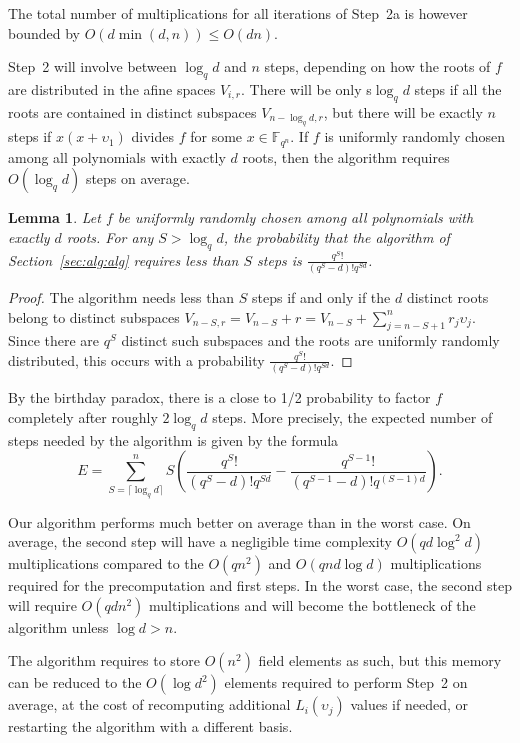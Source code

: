 \documentclass{sig-alternate}
\newcommand{\ff}[1]{\mathbb{F}_{#1}}
\newcommand{\fqn}{\ff{q^n}}
\newcounter{algo}
\newtheorem{Lem}{Lemma}
\begin{document}
The total number of multiplications for all iterations of Step~2a is however bounded by $O(d\min(d,n))\leq O(dn)$.

Step~2 will involve between $\log_qd$ and $n$ steps, depending on how the roots of $f$ are distributed in the afine spaces $V_{i,r}$. There will be only s$\log_qd$ steps if all the roots are contained in distinct subspaces $V_{n-\log_qd,r}$, but there will be exactly $n$ steps if $x(x+\upsilon_1)$ divides $f$ for some $x\in\fqn$. 
%
If $f$ is uniformly randomly chosen among all polynomials with exactly $d$ roots, then the algorithm requires $O(\log_qd)$ steps on average.


\begin{Lem}
Let $f$ be uniformly randomly chosen among all polynomials with exactly $d$ roots. For any $S>\log_qd$, the probability that the algorithm of Section~\ref{sec:alg:alg} requires less than $S$ steps is $\frac{q^S!}{(q^S-d)!q^{Sd}}$. 
\end{Lem}
\begin{proof}
The algorithm needs less than $S$ steps if and only if the $d$ distinct roots belong to distinct subspaces $V_{n-S,r}=V_{n-S}+r=V_{n-S}+\sum_{j=n-S+1}^nr_j\upsilon_j$. Since there are $q^S$ distinct such subspaces and the roots are uniformly randomly distributed, this occurs with a probability $\frac{q^S!}{(q^S-d)!q^{Sd}}$.
\end{proof}
%
\noindent By the birthday paradox, there is a close to 1/2 probability to factor $f$ completely after roughly $2\log_qd$ steps. More precisely, the expected number of steps needed by the algorithm is given by the formula
$$E=\sum_{S=\lceil\log_qd\rceil}^nS\left(\frac{q^S!}{(q^S-d)!q^{Sd}}-\frac{q^{S-1}!}{(q^{S-1}-d)!q^{(S-1)d}}\right).$$

Our algorithm performs much better on average than in the worst case. On average, the second step will have a negligible time complexity $O(qd\log^2d)$ multiplications compared to the $O(qn^2)$ and $O(qnd\log d)$ multiplications required for the precomputation and first steps.
%
In the worst case, the second step will require $O(qdn^2)$ multiplications and will become the bottleneck of the algorithm unless $\log d>n$.

The algorithm requires to store $O(n^2)$ field elements as such, but this memory can be reduced to the $O(\log d^2)$ elements required to perform Step~2 on average, at the cost of recomputing additional $L_i(\upsilon_j)$ values if needed, or restarting the algorithm with a different basis. 
\end{document}
